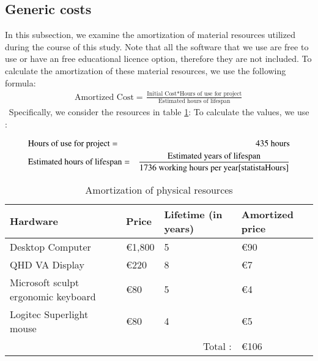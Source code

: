 \subsection{Generic costs}
In this subsection, we examine the amortization of material resources utilized during the course of this study. Note that all the software that we use are free to use or have an free educational licence option, therefore they are not included.
To calculate the amortization of these material resources, we use the following formula:
\begin{align*}
    \text{Amortized Cost} = \frac{\text{Initial Cost}*\text{Hours of use for project}}{\text{Estimated hours of lifespan}}
\end{align*}
$\frac{}{}$
Specifically, we consider the resources in table \ref{tab:amortization}:
To calculate the values, we use :
\begin{framed}
\begin{align*}
    &\text{Hours of use for project} =& 435 \text{ hours}\\
    &\text{Estimated hours of lifespan} = &\frac{\text{Estimated years of lifespan}}{1736\text{ working hours per year} \cite{statistaHours}}
\end{align*}    
\end{framed}
\begin{table}[!ht]
    \centering
    \begin{tabular}{|l|l|l|l|}
    \hline
        \rowcolor{black!25}
        Hardware & Price & Lifetime (in years) & Amortized price \\ \hline
        Desktop Computer & €1,800 & 5 & €90 \\ \hline
        QHD VA Display & €220 & 8 & €7 \\ \hline
        Microsoft sculpt ergonomic keyboard & €80 & 5 & €4 \\ \hline
        Logitec Superlight mouse & €80 & 4 & €5 \\ \hline
        \multicolumn{3}{r|}{Total :} & €106 \\ \cline{4-4}
    \end{tabular}
    \caption{Amortization of physical resources}
    \label{tab:amortization}
\end{table}

